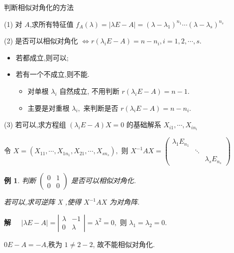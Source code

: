 \documentclass[13pt]{beamer}
\newtheorem{exa}{例}
\def\sol{{\bf 解~~ }}
\begin{document}
\begin{frame}{判断相似对角化的方法}



(1) 对 $A$,求所有特征值 $f_{A}(\lambda)=|\lambda E-A|=\left(\lambda-\lambda_{1}\right)^{n_{1}} \cdots\left(\lambda-\lambda_{s}\right)^{n_{s}}$


(2) 是否可以相似对角化 $\Leftrightarrow r\left(\lambda_{i} E-A\right)=n-n_{i}, i=1,2, \cdots, s$.
\begin{itemize}
	\item 若都成立,则可以;
	\item 若有一个不成立,则不能. 
	\begin{itemize}
		\item 对单根 $\lambda_{i}$ 自然成立, 不用判断 $r\left(\lambda_{i} E-A\right)=n-1$.
		\item 主要是对重根 $\lambda_{i},$ 来判断是否 $r\left(\lambda_{i} E-A\right)=n-n_{i}$.
	\end{itemize}
\end{itemize}


(3) 若可以,求方程组 $\left(\lambda_{i} E-A\right) X=0$ 的基础解系 $X_{i 1},  \cdots, X_{i n_{i}}$

令 $X=\left(X_{11}, \cdots, X_{1 n_{1}}, X_{21}, \cdots,  X_{s n_{s}}\right),$ 则 
$X^{-1} A X=
\left(\begin{array}{ccc}
\lambda_{1} E_{n_{1}} & & \\ 
& \ddots & \\ 
& & \lambda_{s} E_{n_{s}}
\end{array}\right)$

\end{frame}



\begin{frame}
\begin{exa}
判断 $\left(\begin{array}{cc}0 & 1 \\ 0 & 0\end{array}\right)$ 是否可以相似对角化. 

若可以,求可逆阵 X ,使得 $X^{-1} A X$ 为对角阵.

\end{exa}
\sol
$|\lambda E-A|=\left|\begin{array}{cc}\lambda & -1 \\ 0 & \lambda\end{array}\right|=\lambda^{2}=0,$ 则 $\lambda_{1}=\lambda_{2}=0$.

$0 E-A=-A$,秩为 $1 \neq 2-2$, 故不能相似对角化.
\end{frame}
\end{document}
